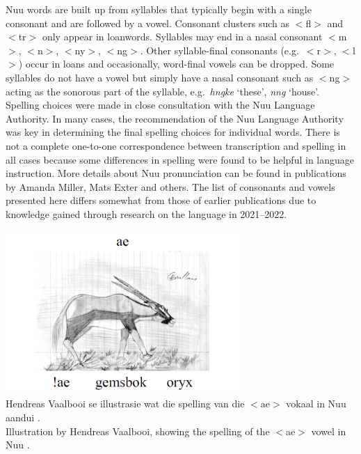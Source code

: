 N\textipa{\textvertline}uu words are built up from syllables that
typically begin with a single consonant and are followed by a vowel.
Consonant clusters such as $<$fl$>$ and $<$tr$>$ only appear in
loanwords. Syllables may end in a nasal consonant $<$m$>$, $<$n$>$,
$<$ny$>$, $<$ng$>$. Other syllable-final consonants (e.g.\ $<$r$>$,
$<$l$>$) occur in loans and occasionally, word-final vowels can be
dropped. Some syllables do not have a vowel but simply have a nasal
consonant such as $<$ng$>$ acting as the sonorous part of the
syllable, e.g.\ \emph{hngke} `these',
\emph{n\textipa{\textdoublevertline}ng} `house'.\\

Spelling choices were made in close consultation with the
N\textipa{\textvertline}uu Language Authority. In many cases, the
recommendation of the N\textipa{\textvertline}uu Language Authority
was key in determining the final spelling choices for individual
words. There is not a complete one-to-one correspondence between
transcription and spelling in all cases because some differences in
spelling were found to be helpful in language instruction. More
details about N\textipa{\textvertline}uu pronunciation can be found in
publications by Amanda Miller, Mats Exter and others. The list of
consonants and vowels presented here differs somewhat from those of
earlier publications due to knowledge gained through research on the
language in 2021--2022.\\

\begin{center}
    \includegraphics[height=6.2cm]{gemsbok.png}\\
    Hendreas Vaalbooi se illustrasie wat die spelling van die $<$ae$>$
    vokaal in N\textipa{\textvertline}uu aandui 
    \parencite{Namaseb2005}.\\
    Illustration by Hendreas Vaalbooi, showing the spelling of the
    $<$ae$>$ vowel in N\textipa{\textvertline}uu
    \parencite{Namaseb2005}.
\end{center}

